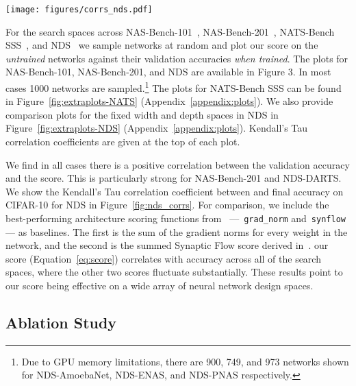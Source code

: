 \documentclass{article}
\begin{document}
\begin{figure*}[!h]

\texttt{[image: figures/corrs\_nds.pdf]}
\caption{Kendall's Tau correlation across each of the NDS CIFAR-10 search spaces. We compare our method to two alternative measures: \texttt{grad\_norm} and \texttt{synflow}. The results for \texttt{grad\_norm} refer to the absolute Euclidean-norm of the gradients over one random mini-batch of data. \texttt{synflow} is the gradient-based score defined by~\cite{tanaka2020pruning}, summed over each parameter in the network.}
\label{fig:nds_corrs}
\end{figure*}

For the search spaces across NAS-Bench-101~\citep{ying2019bench}, NAS-Bench-201~\citep{Dong2020NAS-Bench-201}, NATS-Bench SSS~\citep{dong2021nats}, and NDS~\citep{radosavovic2019network} we sample networks at random and plot our score  on the {\it untrained} networks against their validation accuracies {\it when trained}. The plots for NAS-Bench-101, NAS-Bench-201, and NDS are available in Figure 3. In most cases 1000 networks are sampled.\footnote{Due to GPU memory limitations, there are 900, 749, and 973 networks shown for NDS-AmoebaNet, NDS-ENAS, and NDS-PNAS respectively.}
The plots for NATS-Bench SSS can be found in Figure~\ref{fig:extraplots-NATS} (Appendix~\ref{appendix:plots}). We also provide comparison plots for the fixed width and depth spaces in NDS in Figure~\ref{fig:extraplots-NDS} (Appendix~\ref{appendix:plots}). Kendall's Tau correlation coefficients  are given at the top of each plot.

We find in all cases there is a positive correlation between the validation accuracy and the score. This is particularly strong for NAS-Bench-201 and NDS-DARTS. We show the Kendall's Tau correlation coefficient between  and final accuracy on CIFAR-10 for NDS in Figure~\ref{fig:nds_corrs}. For comparison, we include the best-performing architecture scoring functions from~\cite{abdelfattah2021zerocost} ---~\texttt{grad\_norm} and~\texttt{synflow} --- as baselines. The first is the sum of the gradient norms for every weight in the network, and the second is the summed Synaptic Flow score derived in~\cite{tanaka2020pruning}. our score (Equation~\ref{eq:score}) correlates with accuracy across all of the search spaces, where the other two scores fluctuate substantially. These results point to our score being effective on a wide array of neural network design spaces.


\subsection{Ablation Study}
\label{sec:ablation}
\end{document}

